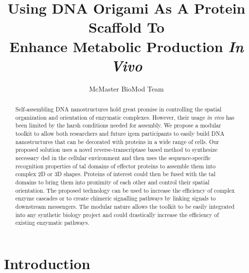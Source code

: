 \documentclass[a4paper]{article}
\title{Using DNA Origami As A Protein Scaffold To \\ Enhance Metabolic Production \textit{In Vivo}}
\author{McMaster BioMod Team}
\date{}
\begin{document}
\maketitle
\thispagestyle{fancy}
\pagestyle{fancy}
\begin{abstract}
Self-assembling DNA nanostructures hold great promise in controlling the spatial organization and orientation of enzymatic complexes.
However, their usage \textit{in vivo} has been limited by the harsh conditions needed for assembly.
We propose a modular toolkit to allow both researchers and future \ac{igem} participants to easily build DNA nanostructures that can be decorated with proteins in a wide range of cells.
Our proposed solution uses a novel  reverse-transcriptase based method to synthesize necessary \ac{dsd} in the cellular environment and then uses the sequence-specific recognition properties of \ac{tal} domains of  effector proteins to assemble them into complex 2D or 3D shapes.
Proteins of interest could then be fused with the \ac{tal} domains to bring them into proximity of each other and control their spatial orientation.
The proposed technology can be used to increase the efficiency of complex enzyme cascades or to create chimeric signalling pathways by linking signals to downstream messengers.
The modular nature allows the toolkit to be easily integrated into any synthetic biology project and could drastically increase the efficiency of existing enzymatic pathways.
\end{abstract}
\section*{Introduction}
\end{document}
